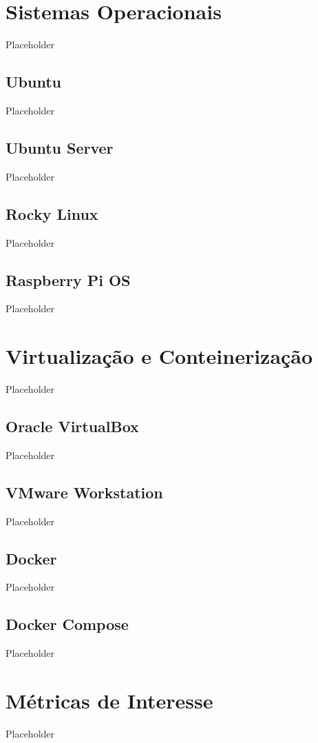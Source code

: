 \section{Sistemas Operacionais}
Placeholder

\subsection{Ubuntu}
Placeholder

\subsection{Ubuntu Server}
Placeholder

\subsection{Rocky Linux}
Placeholder

\subsection{Raspberry Pi OS}
Placeholder

\section{Virtualização e Conteinerização}
Placeholder

\subsection{Oracle VirtualBox}
Placeholder

\subsection{VMware Workstation}
Placeholder

\subsection{Docker}
Placeholder

\subsection{Docker Compose}
Placeholder

\section{Métricas de Interesse}
Placeholder

